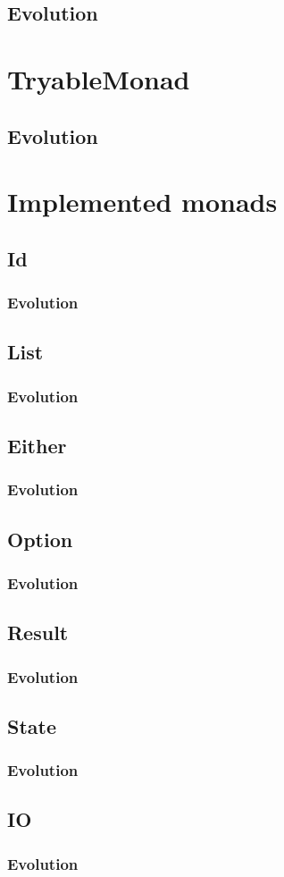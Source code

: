 \subsection{Evolution}

\section{TryableMonad}
\subsection{Evolution}

\section{Implemented monads}
\subsection{Id}
\subsubsection{Evolution}
\subsection{List}
\subsubsection{Evolution}
\subsection{Either}
\subsubsection{Evolution}
\subsection{Option}
\subsubsection{Evolution}
\subsection{Result}
\subsubsection{Evolution}
\subsection{State}
\subsubsection{Evolution}
\subsection{IO}
\subsubsection{Evolution}
